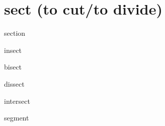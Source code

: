 \chapter{sect (to cut/to divide)}

\begin{word}{section}
\end{word}

\begin{word}{insect}
\end{word}

\begin{word}{bisect}
\end{word}

\begin{word}{dissect}
\end{word}

\begin{word}{intersect}
\end{word}

\begin{word}{segment}
\end{word}